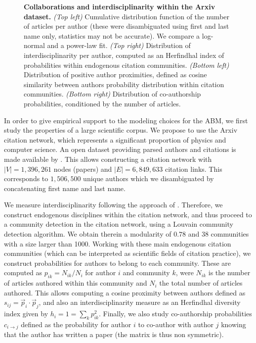 \documentclass[utf8]{frontiersFPHY} %
\begin{document}
\begin{figure}
\caption{\textbf{Collaborations and interdisciplinarity within the Arxiv dataset.} \textit{(Top left)} Cumulative distribution function of the number of articles per author (these were disambiguated using first and last name only, statistics may not be accurate). We compare a log-normal and a power-law fit. \textit{(Top right)} Distribution of interdisciplinarity per author, computed as an Herfindhal index of probabilities within endogenous citation communities. \textit{(Bottom left)} Distribution of positive author proximities, defined as cosine similarity between authors probability distribution within citation communities. \textit{(Bottom right)} Distribution of co-authorship probabilities, conditioned by the number of articles.\label{fig:empirical}}
\end{figure}


In order to give empirical support to the modeling choices for the ABM, we first study the properties of a large scientific corpus. We propose to use the Arxiv citation network, which represents a significant proportion of physics and computer science. An open dataset providing parsed authors and citations is made available by \cite{clement2019use}. This allows constructing a citation network with $\left|V\right| = 1,396,261$ nodes (papers) and $\left|E\right| = 6,849,633$ citation links. This corresponds to $1,506,500$ unique authors which we disambiguated by concatenating first name and last name.

We measure interdisciplinarity following the approach of \cite{raimbault2019exploration}. Therefore, we construct endogenous disciplines within the citation network, and thus proceed to a community detection in the citation network, using a Louvain community detection algorithm. We obtain therein a modularity of $0.78$ and 38 communities with a size larger than 1000. Working with these main endogenous citation communities (which can be interpreted as scientific fields of citation practice), we construct probabilities for authors to belong to each community. These are computed as $p_{ik} = N_{ik} / N_{i}$ for author $i$ and community $k$, were $N_{ik}$ is the number of articles authored within this community and $N_i$ the total number of articles authored. This allows computing a cosine proximity between authors defined as $s_{ij} = \vec{p}_i \cdot \vec{p}_j$, and also an interdisciplinarity measure as an Herfindhal diversity index given by $h_i = 1 = \sum_k p_{ik}^2$. Finally, we also study co-authorship probabilities $c_{i \rightarrow j}$ defined as the probability for author $i$ to co-author with author $j$ knowing that the author has written a paper (the matrix is thus non symmetric).
\end{document}
